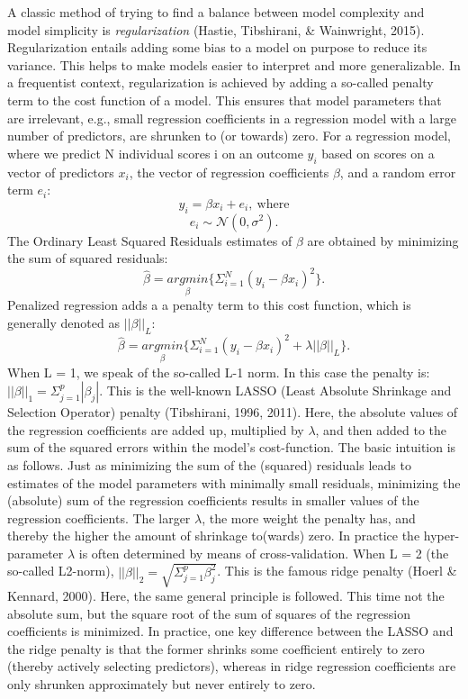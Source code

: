 \documentclass[
  man, donotrepeattitle,floatsintext]{apa6}
\begin{document}
A classic method of trying to find a balance between model complexity and model simplicity is \emph{regularization} (Hastie, Tibshirani, \& Wainwright, 2015). Regularization entails adding some bias to a model on purpose to reduce its variance. This helps to make models easier to interpret and more generalizable. In a frequentist context, regularization is achieved by adding a so-called penalty term to the cost function of a model. This ensures that model parameters that are irrelevant, e.g., small regression coefficients in a regression model with a large number of predictors, are shrunken to (or towards) zero. For a regression model, where we predict N individual scores i on an outcome \(y_i\) based on scores on a vector of predictors \(x_i\), the vector of regression coefficients \(\beta\), and a random error term \(e_i\):
\[y_i = \beta x_i + e_i, \ \text{where} \]
\[e_i \sim \mathcal{N}(0, \sigma^2). \]
The Ordinary Least Squared Residuals estimates of \(\beta\) are obtained by minimizing the sum of squared residuals:
\[ \hat{\beta} = \underset{\beta}{argmin} \{ \Sigma_{i=1}^N(y_i - \beta x_{i} )^2 \}.\] Penalized regression adds a a penalty term to this cost function, which is generally denoted as \(||\beta||_L\):
\[ \hat{\beta} = \underset{\beta}{argmin} \{ \Sigma_{i=1}^N(y_i - \beta x_{i} )^2 + \lambda ||\beta||_{L} \}.\]
When L = 1, we speak of the so-called L-1 norm. In this case the penalty is: \(||\beta||_1 = \Sigma_{j=1}^p |\beta_j|\). This is the well-known LASSO (Least Absolute Shrinkage and Selection Operator) penalty (Tibshirani, 1996, 2011). Here, the absolute values of the regression coefficients are added up, multiplied by \(\lambda\), and then added to the sum of the squared errors within the model's cost-function. The basic intuition is as follows. Just as minimizing the sum of the (squared) residuals leads to estimates of the model parameters with minimally small residuals, minimizing the (absolute) sum of the regression coefficients results in smaller values of the regression coefficients. The larger \(\lambda\), the more weight the penalty has, and thereby the higher the amount of shrinkage to(wards) zero. In practice the hyper-parameter \(\lambda\) is often determined by means of cross-validation. When L = 2 (the so-called L2-norm), \(||\beta||_2 = \sqrt{\Sigma_{j=1}^p \beta_j^2}\). This is the famous ridge penalty (Hoerl \& Kennard, 2000). Here, the same general principle is followed. This time not the absolute sum, but the square root of the sum of squares of the regression coefficients is minimized. In practice, one key difference between the LASSO and the ridge penalty is that the former shrinks some coefficient entirely to zero (thereby actively selecting predictors), whereas in ridge regression coefficients are only shrunken approximately but never entirely to zero.
\end{document}
